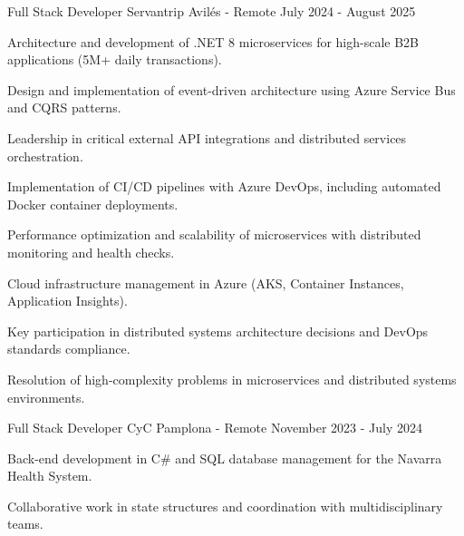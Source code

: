 
\begin{cventries}
    \cventry
    {Full Stack Developer} %
    {Servantrip} %
    {Avilés - Remote} %
    {July 2024 - August 2025} %
    {
        \begin{cvitems} %
            \item {Architecture and development of .NET 8 microservices for high-scale B2B applications (5M+ daily transactions).}
            \item {Design and implementation of event-driven architecture using Azure Service Bus and CQRS patterns.}
            \item {Leadership in critical external API integrations and distributed services orchestration.}
            \item {Implementation of CI/CD pipelines with Azure DevOps, including automated Docker container deployments.}
            \item {Performance optimization and scalability of microservices with distributed monitoring and health checks.}
            \item {Cloud infrastructure management in Azure (AKS, Container Instances, Application Insights).}
            \item {Key participation in distributed systems architecture decisions and DevOps standards compliance.}
            \item {Resolution of high-complexity problems in microservices and distributed systems environments.}
        \end{cvitems}
    }
    \cventry
    {Full Stack Developer} %
    {CyC} %
    {Pamplona - Remote} %
    {November 2023 - July 2024} %
    {
        \begin{cvitems}
            \item {Back-end development in C# and SQL database management for the Navarra Health System.}
            \item {Collaborative work in state structures and coordination with multidisciplinary teams.}

\end{cvitems}}
\end{cventries}
